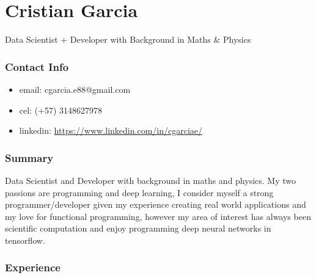 \documentclass[]{article}
\begin{document}
\section{Cristian Garcia}\label{cristian-garcia}

Data Scientist + Developer with Background in Maths \& Physics

\subsubsection{Contact Info}\label{contact-info}

\begin{itemize}
\itemsep1pt\parskip0pt
\item
  email: cgarcia.e88@gmail.com
\item
  cel: (+57) 3148627978
\item
  linkedin: \url{https://www.linkedin.com/in/cgarciae/}
\end{itemize}

\subsubsection{Summary}\label{summary}

Data Scientist and Developer with background in maths and physics. My
two passions are programming and deep learning, I consider myself a
strong programmer/developer given my experience creating real world
applications and my love for functional programming, however my area of
interest has always been scientific computation and enjoy programming
deep neural networks in tensorflow.

\subsubsection{Experience}\label{experience}
\end{document}
